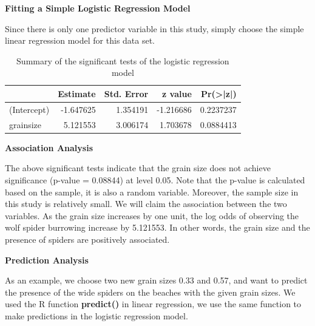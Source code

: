 \documentclass[
]{book}
\newenvironment{Shaded}{\begin{snugshade}}{\end{snugshade}}
\newcommand{\AttributeTok}[1]{\textcolor[rgb]{0.13,0.29,0.53}{#1}}
\newcommand{\FunctionTok}[1]{\textcolor[rgb]{0.13,0.29,0.53}{\textbf{#1}}}
\newcommand{\NormalTok}[1]{#1}
\newcommand{\OtherTok}[1]{\textcolor[rgb]{0.56,0.35,0.01}{#1}}
\newcommand{\SpecialCharTok}[1]{\textcolor[rgb]{0.81,0.36,0.00}{\textbf{#1}}}
\newcommand{\StringTok}[1]{\textcolor[rgb]{0.31,0.60,0.02}{#1}}
\begin{document}
\textbf{Fitting a Simple Logistic Regression Model}

Since there is only one predictor variable in this study, simply choose the simple linear regression model for this data set.

\begin{Shaded}
\end{Shaded}

\begin{table}

\caption{\label{tab:unnamed-chunk-97}Summary of the significant tests of 
      the logistic regression model}
\centering
\begin{tabular}[t]{l|r|r|r|r}
\hline
  & Estimate & Std. Error & z value & Pr(>|z|)\\
\hline
(Intercept) & -1.647625 & 1.354191 & -1.216686 & 0.2237237\\
\hline
grainsize & 5.121553 & 3.006174 & 1.703678 & 0.0884413\\
\hline
\end{tabular}
\end{table}

\textbf{Association Analysis}

The above significant tests indicate that the grain size does not achieve significance (p-value = 0.08844) at level 0.05. Note that the p-value is calculated based on the sample, it is also a random variable. Moreover, the sample size in this study is relatively small. We will claim the association between the two variables. As the grain size increases by one unit, the log odds of observing the wolf spider burrowing increase by 5.121553. In other words, the grain size and the presence of spiders are positively associated.

\textbf{Prediction Analysis}

As an example, we choose two new grain sizes 0.33 and 0.57, and want to predict the presence of the wide spiders on the beaches with the given grain sizes. We used the R function \textbf{predict()} in linear regression, we use the same function to make predictions in the logistic regression model.
\end{document}
